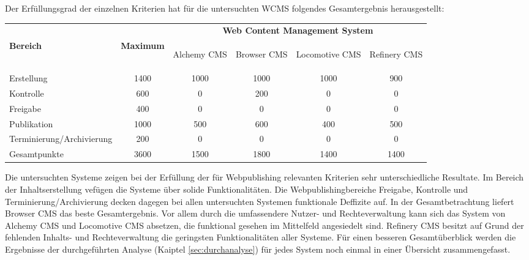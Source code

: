 Der Erfüllungsgrad der einzelnen Kriterien hat für die untersuchten WCMS folgendes Gesamtergebnis herausgestellt:

\begin{table}[!h]
\renewcommand{\arraystretch}{1.5}
\center
\begin{tabular}{|l|c|c|c|c|c|}
\hline
& & \multicolumn{4}{c|}{\textbf{Web Content Management System}} \\[2pt]
\cline{3-6}
\textbf{Bereich}& \textbf{Maximum} &
\begin{sideways}
Alchemy CMS
\end{sideways}
&\begin{sideways}
Browser CMS
\end{sideways}
&\begin{sideways}
Locomotive CMS
\end{sideways}
&\begin{sideways}
Refinery CMS
\end{sideways} \\
\hline
Erstellung & 1400 & 1000 & 1000 & 1000 & 900 \\
\hline
Kontrolle & 600 & 0 & 200 & 0 & 0 \\
\hline
Freigabe & 400 & 0 & 0 & 0 & 0 \\
\hline
Publikation & 1000 & 500 & 600 & 400 & 500 \\
\hline
Terminierung/Archivierung & 200 & 0 & 0 & 0 & 0 \\
\hline
\hline
Gesamtpunkte & 3600 & 1500 & 1800 & 1400 & 1400 \\
\hline
\end{tabular}
\end{table}


Die untersuchten Systeme zeigen bei der Erfüllung der für Webpublishing relevanten Kriterien sehr unterschiedliche Resultate. Im Bereich der Inhaltserstellung vefügen die Systeme über solide Funktionalitäten. Die Webpublishingbereiche Freigabe, Kontrolle und Terminierung/Archivierung decken dagegen bei allen untersuchten Systemen funktionale Deffizite auf. In der Gesamtbetrachtung liefert Browser CMS das beste Gesamtergebnis. Vor allem durch die umfassendere Nutzer- und Rechteverwaltung kann sich das System von Alchemy CMS und Locomotive CMS absetzen, die funktional gesehen im Mittelfeld angesiedelt sind. Refinery CMS besitzt auf Grund der fehlenden Inhalts- und Rechteverwaltung die geringsten Funktionalitäten aller Systeme.
\newline
Für einen besseren Gesamtüberblick werden die Ergebnisse der durchgeführten Analyse (Kaiptel \ref{sec:durchanalyse}) für jedes System noch einmal in einer Übersicht zusammengefasst.


